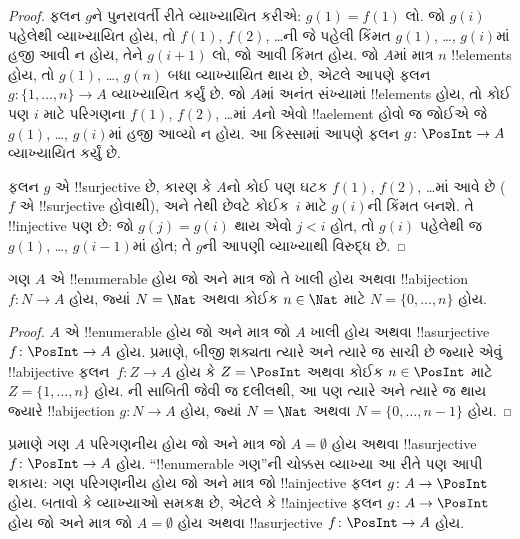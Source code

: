 \documentclass[../../../include/open-logic-section]{subfiles}
\begin{document}
\begin{proof}
ફલન $g$ને પુનરાવર્તી રીતે વ્યાખ્યાયિત કરીએ:
$g(1) = f(1)$ લો. જો $g(i)$ પહેલેથી વ્યાખ્યાયિત હોય,
તો $f(1)$, $f(2)$, \dots{}ની જે પહેલી કિંમત
$g(1)$, \dots, $g(i)$માં હજી આવી ન હોય,
તેને $g(i+1)$ લો, જો આવી કિંમત હોય.
જો $A$માં માત્ર $n$ !!{element}s હોય, તો
$g(1)$, \dots, $g(n)$ બધા વ્યાખ્યાયિત થાય છે,
એટલે આપણે ફલન $g\colon \{1, \dots, n\}
\to A$ વ્યાખ્યાયિત કર્યું છે. જો $A$માં અનંત
સંખ્યામાં !!{element}s હોય, તો કોઈ પણ $i$ માટે
પરિગણના $f(1)$, $f(2)$, \dots{}માં $A$નો એવો
!!a{element} હોવો જ જોઈએ જે $g(1)$, \dots, $g(i)$માં
હજી આવ્યો ન હોય. આ કિસ્સામાં આપણે ફલન
$g\colon \PosInt \to A$ વ્યાખ્યાયિત કર્યું છે.

ફલન $g$ એ !!{surjective} છે, કારણ કે $A$નો
કોઈ પણ ઘટક $f(1)$, $f(2)$, \dots{}માં આવે છે
($f$ એ !!{surjective} હોવાથી), અને તેથી છેવટે
કોઈક~$i$ માટે $g(i)$ની કિંમત બનશે.
તે !!{injective} પણ છે: જો $g(j) = g(i)$ થાય
એવો $j < i$ હોત, તો $g(i)$ પહેલેથી જ
$g(1)$, \dots, $g(i-1)$માં હોત; તે $g$ની
આપણી વ્યાખ્યાથી વિરુદ્ધ છે.
\end{proof}

\begin{cor}
ગણ $A$ એ !!{enumerable} હોય જો અને માત્ર જો
તે ખાલી હોય અથવા !!a{bijection}
$f\colon N \to A$ હોય, જ્યાં $N = \Nat$
અથવા કોઈક $n \in \Nat$ માટે $N = \{0, \dots, n\}$ હોય.
\end{cor}

\begin{proof}
$A$ એ !!{enumerable} હોય જો અને માત્ર જો $A$
ખાલી હોય અથવા !!a{surjective} $f\colon \PosInt \to A$
હોય.  પ્રમાણે, બીજી શક્યતા
ત્યારે અને ત્યારે જ સાચી છે જ્યારે એવું !!a{bijective}
ફલન~$f\colon Z \to A$ હોય કે $Z =
\PosInt$ અથવા કોઈક $n \in \PosInt$ માટે
$Z = \{1, \dots, n\}$ હોય.
ની સાબિતી જેવી જ દલીલથી,
આ પણ ત્યારે અને ત્યારે જ થાય જ્યારે
!!a{bijection} $g\colon N \to A$ હોય, જ્યાં
$N = \Nat$ અથવા $N = \{0, \dots, n-1\}$ હોય.
\end{proof}

\begin{prob}
 પ્રમાણે ગણ $A$
પરિગણનીય હોય જો અને માત્ર જો $A = \emptyset$
હોય અથવા !!a{surjective} $f\colon
\PosInt \to A$ હોય. “!!{enumerable} ગણ”ની ચોક્કસ
વ્યાખ્યા આ રીતે પણ આપી શકાય: ગણ પરિગણનીય હોય
જો અને માત્ર જો !!a{injective} ફલન
$g\colon A \to \PosInt$ હોય.
બતાવો કે વ્યાખ્યાઓ સમકક્ષ છે, એટલે કે
!!a{injective} ફલન $g\colon A \to \PosInt$
હોય જો અને માત્ર જો $A = \emptyset$ હોય અથવા
!!a{surjective} $f\colon \PosInt \to A$ હોય.
\end{prob}
\end{document}

